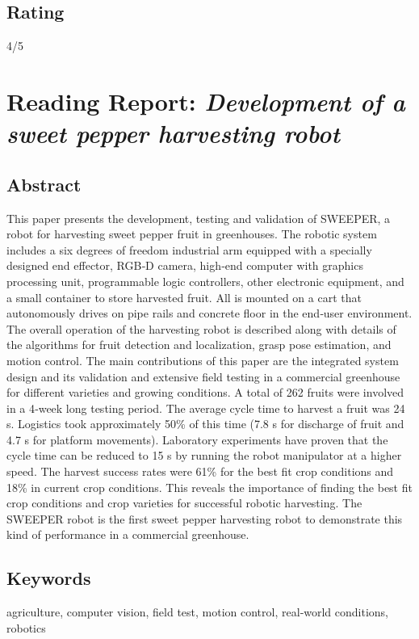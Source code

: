     \subsection*{Rating}
    4/5
    
    
    
    \newpage
    \section{Reading Report: \emph{Development of a sweet pepper harvesting robot}}
    \cite{Arad2020}
    
    \subsection*{Abstract}
    This paper presents the development, testing and validation of SWEEPER, a robot for
    harvesting sweet pepper fruit in greenhouses. The robotic system includes a six
    degrees of freedom industrial arm equipped with a specially designed end effector,
    RGB‐D camera, high‐end computer with graphics processing unit, programmable logic
    controllers, other electronic equipment, and a small container to store harvested
    fruit. All is mounted on a cart that autonomously drives on pipe rails and concrete
    floor in the end‐user environment. The overall operation of the harvesting robot is
    described along with details of the algorithms for fruit detection and localization,
    grasp pose estimation, and motion control. The main contributions of this paper are
    the integrated system design and its validation and extensive field testing in a
    commercial greenhouse for different varieties and growing conditions. A total of 262
    fruits were involved in a 4‐week long testing period. The average cycle time to
    harvest a fruit was 24 s. Logistics took approximately 50\% of this time (7.8 s for
    discharge of fruit and 4.7 s for platform movements). Laboratory experiments have
    proven that the cycle time can be reduced to 15 s by running the robot manipulator at
    a higher speed. The harvest success rates were 61\% for the best fit crop conditions
    and 18\% in current crop conditions. This reveals the importance of finding the best fit
    crop conditions and crop varieties for successful robotic harvesting. The SWEEPER
    robot is the first sweet pepper harvesting robot to demonstrate this kind of
    performance in a commercial greenhouse.
    
    
    \subsection*{Keywords}
    agriculture, computer vision, field test, motion control, real‐world conditions, robotics
    
